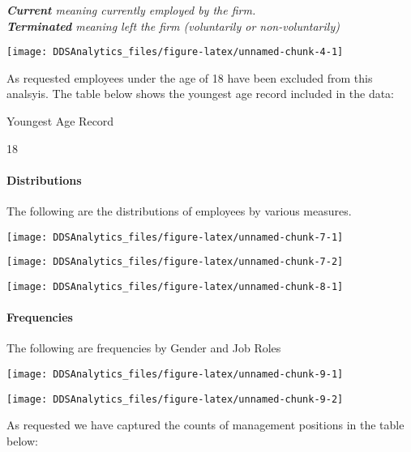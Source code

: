 \documentclass[]{article}
\let\oldparagraph\paragraph
\renewcommand{\paragraph}[1]{\oldparagraph{#1}\mbox{}}
\begin{document}
\emph{\textbf{Current} meaning currently employed by the firm.}\\
\emph{\textbf{Terminated} meaning left the firm (voluntarily or
non-voluntarily)}

\begin{center}\texttt{[image: DDSAnalytics\_files/figure-latex/unnamed-chunk-4-1]} \end{center}

As requested employees under the age of 18 have been excluded from this
analsyis. The table below shows the youngest age record included in the
data:

Youngest Age Record

18

\paragraph{Distributions}\label{distributions}

The following are the distributions of employees by various measures.

\begin{center}\texttt{[image: DDSAnalytics\_files/figure-latex/unnamed-chunk-7-1]} \end{center}

\begin{center}\texttt{[image: DDSAnalytics\_files/figure-latex/unnamed-chunk-7-2]} \end{center}

\begin{center}\texttt{[image: DDSAnalytics\_files/figure-latex/unnamed-chunk-8-1]} \end{center}

\paragraph{Frequencies}\label{frequencies}

The following are frequencies by Gender and Job Roles

\begin{center}\texttt{[image: DDSAnalytics\_files/figure-latex/unnamed-chunk-9-1]} \end{center}

\begin{center}\texttt{[image: DDSAnalytics\_files/figure-latex/unnamed-chunk-9-2]} \end{center}

As requested we have captured the counts of management positions in the
table below:
\end{document}
